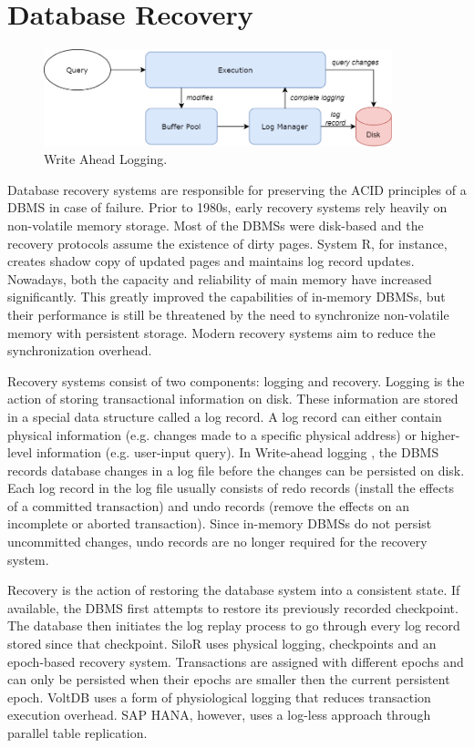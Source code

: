 \documentclass[12pt]{cmuthesis}
\begin{document}
\section{Database Recovery}
\begin{figure}[H]
\centering
\includegraphics[width=0.9\textwidth]{images/Logging.png}
\caption{Write Ahead Logging.}
\label{fig:logging}
\end{figure}
Database recovery systems are responsible for preserving the ACID principles of a DBMS in case of failure. Prior to 1980s, early recovery systems rely heavily on non-volatile memory storage. Most of the DBMSs were disk-based and the recovery protocols assume the existence of dirty pages. System R\cite{system_r}, for instance, creates shadow copy of updated pages and maintains log record updates. Nowadays, both the capacity and reliability of main memory have increased significantly. This greatly improved the capabilities of in-memory DBMSs, but their performance is still be threatened by the need to synchronize non-volatile memory with persistent storage. Modern recovery systems aim to reduce the synchronization overhead.

Recovery systems consist of two components: logging and recovery. Logging is the action of storing transactional information on disk. These information are stored in a special data structure called a log record. A log record can either contain physical information (e.g. changes made to a specific physical address) or higher-level information (e.g. user-input query). In Write-ahead logging \cite{aries}, the DBMS records database changes in a log file before the changes can be persisted on disk. Each log record in the log file usually consists of redo records (install the effects of a committed transaction) and undo records (remove the effects on an incomplete or aborted transaction). Since in-memory DBMSs do not persist uncommitted changes, undo records are no longer required for the recovery system.

Recovery is the action of restoring the database system into a consistent state. If available, the DBMS first attempts to restore its previously recorded checkpoint. The database then initiates the log replay process to go through every log record stored since that checkpoint. SiloR\cite{silo_r} uses physical logging, checkpoints and an epoch-based recovery system. Transactions are assigned with different epochs and can only be persisted when their epochs are smaller then the current persistent epoch. VoltDB\cite{malviya14} uses a form of physiological logging that reduces transaction execution overhead. SAP HANA\cite{lee18}, however, uses a log-less approach through parallel table replication.
\end{document}

